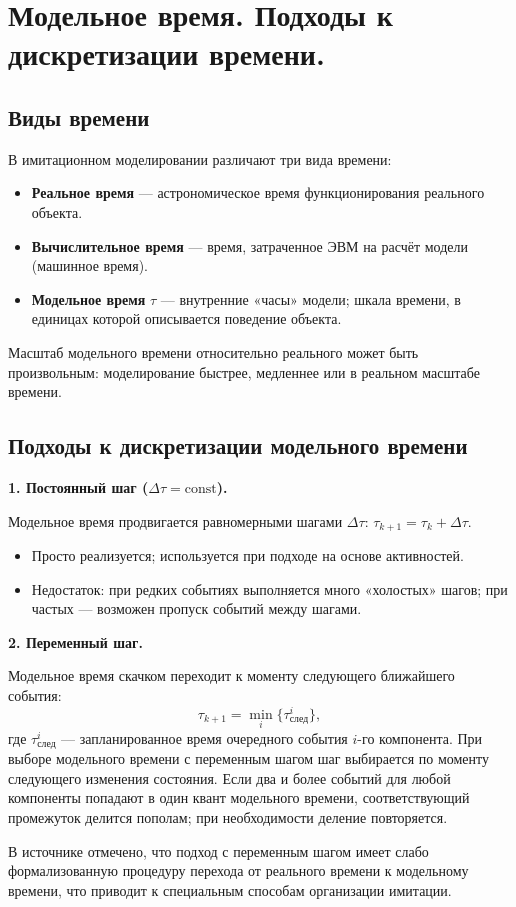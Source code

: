 \section{Модельное время. Подходы к дискретизации времени.}

\subsection*{Виды времени}

В имитационном моделировании различают три вида времени:
\begin{itemize}
  \item \textbf{Реальное время} — астрономическое время функционирования реального объекта.
  \item \textbf{Вычислительное время} — время, затраченное ЭВМ на расчёт модели (машинное время).
  \item \textbf{Модельное время} $\tau$ — внутренние «часы» модели; шкала времени, в единицах которой описывается поведение объекта.
\end{itemize}

Масштаб модельного времени относительно реального может быть произвольным: моделирование быстрее, медленнее или в реальном масштабе времени.

\subsection*{Подходы к дискретизации модельного времени}

\textbf{1. Постоянный шаг ($\Delta\tau = \mathrm{const}$).}

Модельное время продвигается равномерными шагами $\Delta\tau$: $\tau_{k+1} = \tau_k + \Delta\tau$.
\begin{itemize}
  \item Просто реализуется; используется при подходе на основе активностей.
  \item Недостаток: при редких событиях выполняется много «холостых» шагов; при частых — возможен пропуск событий между шагами.
\end{itemize}

\textbf{2. Переменный шаг.}

Модельное время скачком переходит к моменту следующего ближайшего события:
\[
  \tau_{k+1} = \min_{i}\bigl\{\tau^i_{\text{след}}\bigr\},
\]
где $\tau^i_{\text{след}}$ — запланированное время очередного события $i$-го компонента.
При выборе модельного времени с переменным шагом шаг выбирается по моменту следующего изменения состояния. Если два и более событий для любой компоненты попадают в один квант модельного времени, соответствующий промежуток делится пополам; при необходимости деление повторяется.

В источнике отмечено, что подход с переменным шагом имеет слабо формализованную процедуру перехода от реального времени к модельному времени, что приводит к специальным способам организации имитации.

\clearpage
